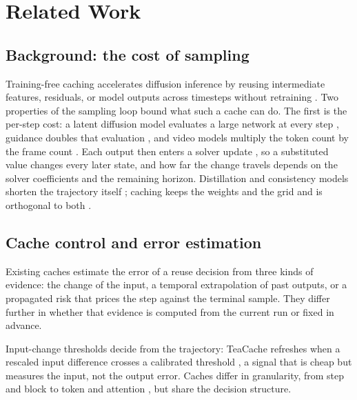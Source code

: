 \section{Related Work}

\subsection{Background: the cost of sampling}
Training-free caching accelerates diffusion inference by reusing intermediate features, residuals, or model outputs across timesteps without retraining \citep{liu2025teacache,liu2025taylorseer,liu2026racfgcache}. Two properties of the sampling loop bound what such a cache can do. The first is the per-step cost: a latent diffusion model evaluates a large network at every step \citep{rombach2022ldm,peebles2023dit}, guidance doubles that evaluation \citep{ho2022cfg}, and video models multiply the token count by the frame count \citep{yang2025cogvideox,wan2025wan,kong2024hunyuanvideo,zheng2024opensora}. Each output then enters a solver update \citep{song2021ddim,zhao2023unipc,lu2022dpm}, so a substituted value changes every later state, and how far the change travels depends on the solver coefficients and the remaining horizon. Distillation and consistency models shorten the trajectory itself \citep{salimans2022progressive,meng2023lcm,song2023consistency}; caching keeps the weights and the grid and is orthogonal to both \citep{liu2025teacache,liu2025taylorseer,liu2026racfgcache}.

\subsection{Cache control and error estimation}
Existing caches estimate the error of a reuse decision from three kinds of evidence: the change of the input, a temporal extrapolation of past outputs, or a propagated risk that prices the step against the terminal sample. They differ further in whether that evidence is computed from the current run or fixed in advance.

Input-change thresholds decide from the trajectory: TeaCache refreshes when a rescaled input difference crosses a calibrated threshold \citep{liu2025teacache}, a signal that is cheap but measures the input, not the output error. Caches differ in granularity, from step \citep{liu2025teacache,liu2025taylorseer} and block \citep{chen2024ddit} to token \citep{zou2024toca,feng2026worldcache} and attention \citep{lv2024fastercache,zhao2024pab}, but share the decision structure.

